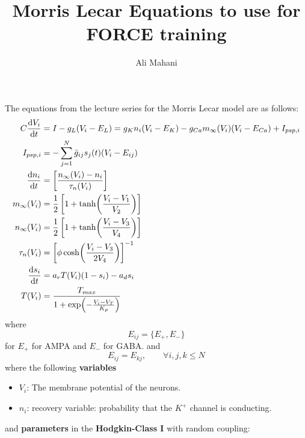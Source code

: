 \documentclass[12pt, letter]{article}
\author{Ali Mahani}
\title{Morris Lecar Equations to use for FORCE training}
\begin{document}
	\maketitle
	
	The equations from the lecture series for the Morris Lecar model are as follows:
	\begin{equation}
		\begin{aligned}
			C\dv{V_i}{t} &= I - g_L(V_i - E_L) = g_K n_i (V_i - E_K) - g_{Ca} m_\infty(V_i) (V_i - E_{Ca}) + I_{psp, i}\\
			I_{psp, i} &= -\sum_{j=1}^{N} \bar{g}_{ij} s_j(t) (V_i - E_{ij})\\
			\dv{n_i}{t} &= \left[\frac{n_\infty(V_i) - n_i}{\tau_n(V_i)}\right]\\
			m_\infty(V_i) &= \frac{1}{2} \left[1 + \tanh(\frac{V_i - V_1}{V_2})\right]\\
			n_\infty(V_i) &= \frac{1}{2} \left[1 + \tanh(\frac{V_i - V_3}{V_4})\right]\\
			\tau_n(V_i) &= \left[\phi \cosh(\frac{V_i - V_3}{2 V_4})\right]^{-1}\\
			\dv{s_i}{t} &= a_r T(V_i)(1 - s_i) - a_d s_i\\
			T(V_i) &= \frac{T_{max}}{1 + \exp(-\frac{V_i - V_T}{K_p})}					
		\end{aligned}
	\end{equation}
	where 
	\begin{equation}
		E_{ij} = \{E_+, E_-\}
	\end{equation}
	for $E_+$ for AMPA and $E_-$ for GABA.
	and 
	\begin{equation}
		E_{ij} = E_{kj}, \qquad \forall i,j,k \le N
	\end{equation}
	where the following \textbf{variables}
	\begin{itemize}
		\item $V_i$: The membrane potential of the neurons.
		\item $n_i$: recovery variable: probability that the $K^+$ channel is conducting. 
	\end{itemize}
	and \textbf{parameters} in the \textbf{Hodgkin-Class I} with random coupling:
\end{document}
